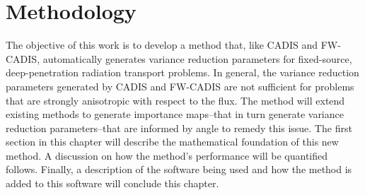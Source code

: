 \chapter{Methodology}

The objective of this work is to develop a method that, like CADIS and FW-CADIS,
automatically generates variance reduction parameters for fixed-source,
deep-penetration radiation transport problems. In general, the variance reduction
parameters generated by CADIS and FW-CADIS are not sufficient for
problems that are strongly
anisotropic with respect to the flux. The method will extend existing
methods to generate importance maps--that in turn generate variance reduction
parameters--that are informed by angle to remedy this issue. The first section
in this chapter will describe
the mathematical foundation of this new method. A discussion on how
the method's performance will be quantified follows. Finally, a description of
the software being used and how the method is added to this software will
conclude this chapter.




